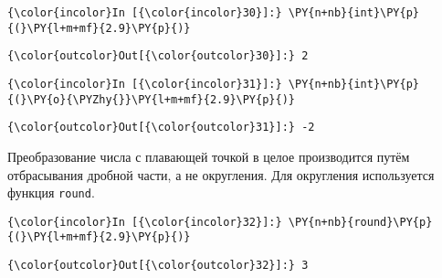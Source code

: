     \begin{Verbatim}[commandchars=\\\{\}]
{\color{incolor}In [{\color{incolor}30}]:} \PY{n+nb}{int}\PY{p}{(}\PY{l+m+mf}{2.9}\PY{p}{)}
\end{Verbatim}

            \begin{Verbatim}[commandchars=\\\{\}]
{\color{outcolor}Out[{\color{outcolor}30}]:} 2
\end{Verbatim}
        
    \begin{Verbatim}[commandchars=\\\{\}]
{\color{incolor}In [{\color{incolor}31}]:} \PY{n+nb}{int}\PY{p}{(}\PY{o}{\PYZhy{}}\PY{l+m+mf}{2.9}\PY{p}{)}
\end{Verbatim}

            \begin{Verbatim}[commandchars=\\\{\}]
{\color{outcolor}Out[{\color{outcolor}31}]:} -2
\end{Verbatim}
        
    Преобразование числа с плавающей точкой в целое производится путём
отбрасывания дробной части, а не округления. Для округления используется
функция \texttt{round}.

    \begin{Verbatim}[commandchars=\\\{\}]
{\color{incolor}In [{\color{incolor}32}]:} \PY{n+nb}{round}\PY{p}{(}\PY{l+m+mf}{2.9}\PY{p}{)}
\end{Verbatim}

            \begin{Verbatim}[commandchars=\\\{\}]
{\color{outcolor}Out[{\color{outcolor}32}]:} 3
\end{Verbatim}
